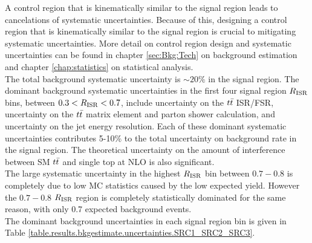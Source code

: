 \indent A control region that is kinematically similar to the signal region leads to cancelations of systematic uncertainties.  Because of this, designing a control region that is kinematically similar to the signal region is crucial to mitigating systematic uncertainties.  More detail on control region design and systematic uncertainties can be found in chapter \ref{sec:Bkg:Tech} on background estimation and chapter \ref{chap:statistics} on statistical analysis.  \\



\indent The total background systematic uncertainty is $\sim20\%$ in the signal region.  The dominant background systematic uncertainties in the first four signal region $R_{\mathrm{ISR}}$ bins, between $0.3 < R_{\mathrm{ISR}} < 0.7$, include uncertainty on the $t\bar{t}$ ISR/FSR, uncertainty on the $t\bar{t}$ matrix element and parton shower calculation, and uncertainty on the jet energy resolution.  Each of these dominant systematic uncertainties contributes 5-10\% to the total uncertainty on background rate in the signal region.  The theoretical uncertainty on the amount of interference between SM $t\bar{t}$ and single top at NLO is also significant.  \\

\indent The large systematic uncertainty in the highest $R_{\mathrm{ISR}}$ bin between $0.7-0.8$ is completely due to low MC statistics caused by the low expected yield.  However the $0.7-0.8$ $R_{\mathrm{ISR}}$ region is completely statistically dominated for the same reason, with only 0.7 expected background events.  \\

\indent The dominant background uncertainties in each signal region bin is given in Table \ref{table.results.bkgestimate.uncertainties.SRC1_SRC2_SRC3}. \\%


